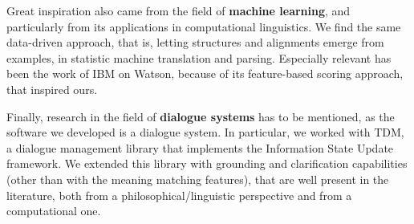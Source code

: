 Great inspiration also came from the field of \textbf{machine learning}, and particularly from its applications in computational linguistics. We find the same data-driven approach, that is, letting structures and alignments emerge from examples, in statistic machine translation and parsing. Especially relevant has been the work of IBM on Watson, because of its feature-based scoring approach, that inspired ours.

Finally, research in the field of \textbf{dialogue systems} has to be mentioned, as the software we developed is a dialogue system. In particular, we worked with TDM, a dialogue management library that implements the Information State Update framework. We extended this library with grounding and clarification capabilities (other than with the meaning matching features), that are well present in the literature, both from a philosophical/linguistic perspective and from a computational one.